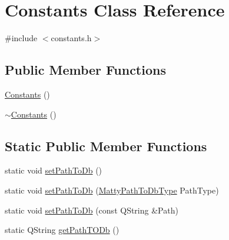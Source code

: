 \hypertarget{class_constants}{}\section{Constants Class Reference}
\label{class_constants}


{\ttfamily \#include $<$constants.\+h$>$}

\subsection*{Public Member Functions}
\begin{DoxyCompactItemize}
\item 
\hyperlink{class_constants_af395b3c1d6f0577f4880a21a257aa1db}{Constants} ()
\item 
\hyperlink{class_constants_a2dce6c6db3f1ba4114550606fae1765a}{$\sim$\+Constants} ()
\end{DoxyCompactItemize}
\subsection*{Static Public Member Functions}
\begin{DoxyCompactItemize}
\item 
static void \hyperlink{class_constants_a8e8a615d22819b445a9ca6250aaddd08}{set\+Path\+To\+Db} ()
\item 
static void \hyperlink{class_constants_a3d474cb2c4e964cb64ab6f2db6e1bf92}{set\+Path\+To\+Db} (\hyperlink{constants_8h_a9558e0854b1cdaf803f7a80df80ab91b}{Matty\+Path\+To\+Db\+Type} Path\+Type)
\item 
static void \hyperlink{class_constants_ac46a51b8ad96c36ebca1ffef26b11f84}{set\+Path\+To\+Db} (const Q\+String \&Path)
\item 
static Q\+String \hyperlink{class_constants_ac74d671466a62e47fa4e431dbc569ba1}{get\+Path\+T\+O\+Db} ()
\end{DoxyCompactItemize}
